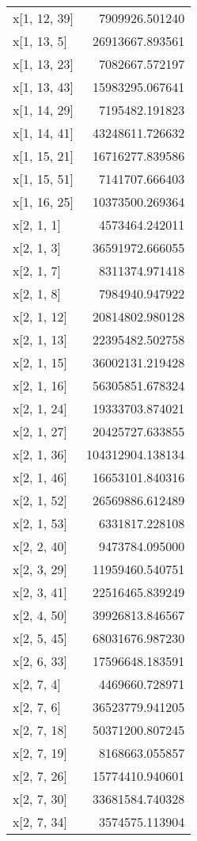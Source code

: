 \begin{longtable}{lr}
x[1, 12, 39] & 7909926.501240 \\
x[1, 13, 5] & 26913667.893561 \\
x[1, 13, 23] & 7082667.572197 \\
x[1, 13, 43] & 15983295.067641 \\
x[1, 14, 29] & 7195482.191823 \\
x[1, 14, 41] & 43248611.726632 \\
x[1, 15, 21] & 16716277.839586 \\
x[1, 15, 51] & 7141707.666403 \\
x[1, 16, 25] & 10373500.269364 \\
x[2, 1, 1] & 4573464.242011 \\
x[2, 1, 3] & 36591972.666055 \\
x[2, 1, 7] & 8311374.971418 \\
x[2, 1, 8] & 7984940.947922 \\
x[2, 1, 12] & 20814802.980128 \\
x[2, 1, 13] & 22395482.502758 \\
x[2, 1, 15] & 36002131.219428 \\
x[2, 1, 16] & 56305851.678324 \\
x[2, 1, 24] & 19333703.874021 \\
x[2, 1, 27] & 20425727.633855 \\
x[2, 1, 36] & 104312904.138134 \\
x[2, 1, 46] & 16653101.840316 \\
x[2, 1, 52] & 26569886.612489 \\
x[2, 1, 53] & 6331817.228108 \\
x[2, 2, 40] & 9473784.095000 \\
x[2, 3, 29] & 11959460.540751 \\
x[2, 3, 41] & 22516465.839249 \\
x[2, 4, 50] & 39926813.846567 \\
x[2, 5, 45] & 68031676.987230 \\
x[2, 6, 33] & 17596648.183591 \\
x[2, 7, 4] & 4469660.728971 \\
x[2, 7, 6] & 36523779.941205 \\
x[2, 7, 18] & 50371200.807245 \\
x[2, 7, 19] & 8168663.055857 \\
x[2, 7, 26] & 15774410.940601 \\
x[2, 7, 30] & 33681584.740328 \\
x[2, 7, 34] & 3574575.113904 \\

\end{longtable}
